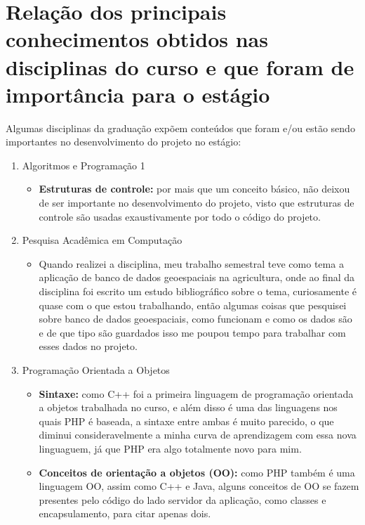 \documentclass{ufscar}
\begin{document}
\section{Relação dos principais conhecimentos obtidos nas disciplinas do curso e que foram de importância para o estágio}
Algumas disciplinas da graduação expõem conteúdos que foram e/ou estão sendo importantes no desenvolvimento do projeto no estágio:
\begin{enumerate}

  \item Algoritmos e Programação 1
  \begin{itemize}
    \item \textbf{Estruturas de controle:} por mais que um conceito básico, não deixou de ser importante no desenvolvimento do projeto, visto que estruturas de controle são usadas exaustivamente por todo o código do projeto.
  \end{itemize}

  \item Pesquisa Acadêmica em Computação
  \begin{itemize}
    \item Quando realizei a disciplina, meu trabalho semestral teve como tema a aplicação de banco de dados geoespaciais na agricultura, onde ao final da disciplina foi escrito um estudo bibliográfico sobre o tema, curiosamente é quase com o que estou trabalhando, então algumas coisas que pesquisei sobre banco de dados geoespaciais, como funcionam e como os dados são e de que tipo são guardados isso me poupou tempo para trabalhar com esses dados no projeto.
  \end{itemize}

  \item Programação Orientada a Objetos
  \begin{itemize}
    \item \textbf{Sintaxe:} como C++ foi a primeira linguagem de programação orientada a objetos trabalhada no curso, e além disso é uma das linguagens nos quais PHP é baseada, a sintaxe entre ambas é muito parecido, o que diminui consideravelmente a minha curva de aprendizagem com essa nova linguaguem, já que PHP era algo totalmente novo para mim.
    \item \textbf{Conceitos de orientação a objetos (OO):} como PHP também é uma linguagem OO, assim como C++ e Java, alguns conceitos de OO se fazem presentes pelo código do lado servidor da aplicação, como classes e encapsulamento, para citar apenas dois.
  \end{itemize}


\end{enumerate}
\end{document}
